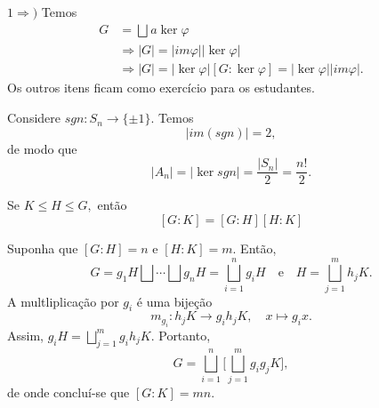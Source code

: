 \documentclass[Algebra/algebra_notes.tex]{subfiles}
\begin{document}
\begin{proof*}
	$1\Rightarrow)$ Temos
	\begin{align*}
		G & = \bigsqcup_{}^{}{a\ker{\varphi}}                                              \\
		  & \Rightarrow |G| = |im\varphi||\ker{\varphi}|                                   \\
		  & \Rightarrow |G| = |\ker\varphi|[G:\ker{\varphi}] = |\ker{\varphi}||im\varphi|.
	\end{align*}
	Os outros itens ficam como exercício para os estudantes. \qedsymbol
\end{proof*}
\begin{example*}
	Considere $sgn:S_{n}\rightarrow \{\pm 1\}.$ Temos
	$$
		|im(sgn)| = 2,
	$$
	de modo que
	$$
		|A_{n}| = |\ker{sgn}| = \frac{|S_{n}|}{2} = \frac{n!}{2}.
	$$
\end{example*}
\begin{prop*}
	Se $K\leq{H}\leq{G},$ então
	$$
		[G:K] = [G:H][H:K]
	$$
\end{prop*}
\begin{proof*}
	Suponha que $[G:H] = n$ e $[H:K]=m$. Então,
	$$
		G = g_{1}H\bigsqcup_{}^{}{\cdots}\bigsqcup_{}^{}{g_{n}H} = \bigsqcup_{i=1}^{n}{g_{i}H}\quad\text{e}\quad H = \bigsqcup_{j=1}^{m}{h_{j}K}.
	$$
	A multliplicação por $g_{i}$ é uma bijeção
	$$
		m_{g_{i}}:h_{j}K\rightarrow g_{i}h_{j}K,\quad x\mapsto g_{i}x.
	$$
	Assim, $g_{i}H = \bigsqcup_{j=1}^{m}{g_{i}h_{j}K}.$ Portanto,
	$$
		G = \bigsqcup_{i=1}^{n}{\biggl[\bigsqcup_{j=1}^{m}{g_{i}g_{j}K}\biggr]},
	$$
	de onde concluí-se que $[G:K]=mn.$ \qedsymbol
\end{proof*}
\end{document}
